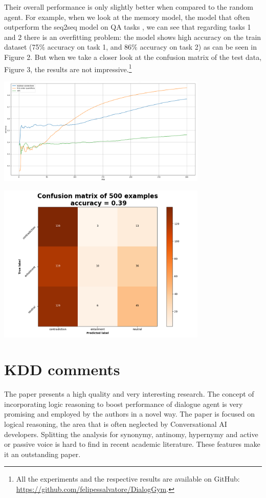 Their overall performance is only slightly better when compared to the random agent. For example, when we look at the memory model, the model that often  outperform the seq2seq model on QA tasks \cite{WestonBCM15}, we can see that regarding tasks 1 and 2 there is an overfitting problem: the model shows high accuracy on the train dataset (75$\%$ accuracy on task 1, and 86$\%$ accuracy on task 2) as can be seen in Figure 2. But when we take a closer look at the confusion matrix of the test data, Figure 3, the results are not impressive.\footnote{All the experiments and the respective results are available on GitHub: \url{https://github.com/felipessalvatore/DialogGym}.}
  

\begin{center}
\includegraphics[width=10.0cm]{img/training_acc_EntailQA_mem.png}
\end{center}


\begin{center}
\includegraphics[width=10.0cm]{img/cm_mem_EntailQA2.png}
\end{center}


\section{KDD comments}
The paper presents a high quality and very interesting research. The concept of incorporating logic reasoning to boost performance of dialogue agent is very promising and employed by the authors in a novel way. The paper is focused on logical reasoning, the area that is often neglected by Conversational AI developers. Splitting the analysis for synonymy, antinomy, hypernymy and active or passive voice is hard to find in recent academic literature. These features make it an outstanding paper.

